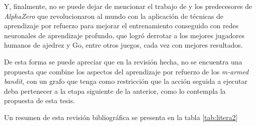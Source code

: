 Y, finalmente, no se puede dejar de mencionar el trabajo de \citet{silver2017mastering} y los predecesores de \textit{AlphaZero} \citep{silver2016mastering} que revolucionaron al mundo con la aplicación de técnicas de aprendizaje por refuerzo para mejorar el entrenamiento conseguido con redes neuronales de aprendizaje profundo, que logró derrotar a los mejores jugadores humanos de ajedrez y Go, entre otros juegos, cada vez con mejores resultados.

De esta forma se puede apreciar que en la revisión hecha, no se encuentra una propuesta que combine los aspectos del aprendizaje por refuerzo de los \textit{m-armed bandit}, con un grafo que tenga como restricción que la acción seguida a ejecutar deba pertenecer a la etapa siguiente de la anterior, como lo contempla la propuesta de esta tesis.

Un resumen de esta revisión bibliográfica se presenta en la tabla \ref{tab:litera2}

